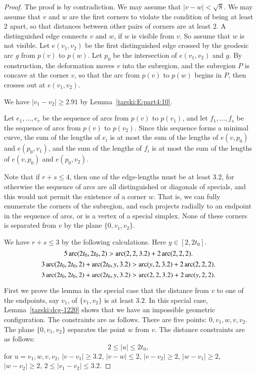 \begin{proof}
The proof is by contradiction. We may assume that $|v-w|<\sqrt8$.
We may assume that $v$ and $w$ are the first corners to violate
the condition of being at least $2$ apart, so that distances
between other pairs of corners are at least $2$.  A distinguished
edge connects $v$ and $w$, if $w$ is visible from $v$. So assume
that $w$ is not visible.  Let $e(v_1,v_2)$ be the first
distinguished edge crossed by the geodesic arc $g$ from $p(v)$ to
$p(w)$. Let $p_0$ be the intersection of $e(v_1,v_2)$ and $g$. By
construction, the deformation moves $v$ into the subregion, and
the subregion $P$ is concave at the corner $v$, so that the arc
from $p(v)$ to $p(w)$ begins in $P$, then crosses out at
$e(v_1,v_2)$.

We have $|v_1-v_2|\ge2.91$ by Lemma~\ref{tarski:E:part4:10}.

Let $e_1,\ldots,e_r$ be the sequence of arcs from $p(v)$ to
$p(v_1)$, and let $f_1,\ldots,f_s$ be the sequence of arcs from
$p(v)$ to $p(v_2)$. Since this sequence forms a minimal curve, the
sum of the lengths of $e_i$ is at most the sum of the lengths of
$e(v,p_0)$ and $e(p_0,v_1)$, and the sum of the lengths of $f_i$
is at most the sum of the lengths of $e(v,p_0)$ and $e(p_0,v_2)$.

Note that if $r+s\le4$, then one of the edge-lengths must be at
least $3.2$, for otherwise the sequence of arcs are all
distinguished or diagonals of specials, and this would not permit
the existence of a corner $w$. That is, we can fully enumerate the
corners of the subregion, and each projects radially to an
endpoint in the sequence of arcs, or is a vertex of a special
simplex. None of these corners is separated from $v$ by the plane
$\{0,v_1,v_2\}$.

We have $r+s\le3$ by the following calculations.  Here
$y\in[2,2t_0]$.
    $$5\operatorname{arc}(2t_0,2t_0,2) > \operatorname{arc}(2,2,3.2)+ 2 \operatorname{arc}(2,2,2).$$
    $$3\operatorname{arc}(2t_0,2t_0,2) + \operatorname{arc}(2t_0,y,3.2) > \operatorname{arc}(y,2,3.2) + 2 \operatorname{arc}(2,2,2).$$
    $$3\operatorname{arc}(2t_0,2t_0,2) + \operatorname{arc}(2t_0,y,3.2) > \operatorname{arc}(2,2,3.2) + 2\operatorname{arc}(y,2,2).$$


First we prove the lemma in the special case that the distance from
$v$ to one of the endpoints, say $v_1$, of $\{v_1,v_2\}$ is at least
$3.2$. In this special case, Lemma~\ref{tarski:dcg-1220} shows
that we have an
impossible geometric configuration. The
constraints are as follows.  There are five points: $0,v_1,w,v,v_2$.
The plane $\{0,v_1,v_2\}$ separates the point $w$ from $v$. The
distance constraints are as follows:
    $$2\le |u| \le 2t_0,$$
for $u=v_1,w,v,v_2$, $|v-v_1|\ge 3.2$, $|v-w|\le2$, $|v-v_2|\ge2$,
$|w-v_1|\ge2$, $|w-v_2|\ge2$, $2\le |v_1-v_2|\le 3.2$.


\end{proof}
